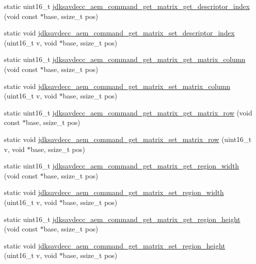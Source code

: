 \begin{DoxyCompactItemize}
static uint16\+\_\+t \hyperlink{group__command__get__matrix_gae06827e874371135ab799f617f6723b3}{jdksavdecc\+\_\+aem\+\_\+command\+\_\+get\+\_\+matrix\+\_\+get\+\_\+descriptor\+\_\+index} (void const $\ast$base, ssize\+\_\+t pos)
\item 
static void \hyperlink{group__command__get__matrix_gaca9cc2cd99f2fc9d00772c2b67e7a411}{jdksavdecc\+\_\+aem\+\_\+command\+\_\+get\+\_\+matrix\+\_\+set\+\_\+descriptor\+\_\+index} (uint16\+\_\+t v, void $\ast$base, ssize\+\_\+t pos)
\item 
static uint16\+\_\+t \hyperlink{group__command__get__matrix_ga8b6906bbd62ce8d5f486ed135860399f}{jdksavdecc\+\_\+aem\+\_\+command\+\_\+get\+\_\+matrix\+\_\+get\+\_\+matrix\+\_\+column} (void const $\ast$base, ssize\+\_\+t pos)
\item 
static void \hyperlink{group__command__get__matrix_gabc0e941d90e8369d8e174cbca31bb1d1}{jdksavdecc\+\_\+aem\+\_\+command\+\_\+get\+\_\+matrix\+\_\+set\+\_\+matrix\+\_\+column} (uint16\+\_\+t v, void $\ast$base, ssize\+\_\+t pos)
\item 
static uint16\+\_\+t \hyperlink{group__command__get__matrix_ga98cce114fc9450f88849c55c12d53578}{jdksavdecc\+\_\+aem\+\_\+command\+\_\+get\+\_\+matrix\+\_\+get\+\_\+matrix\+\_\+row} (void const $\ast$base, ssize\+\_\+t pos)
\item 
static void \hyperlink{group__command__get__matrix_ga7e74565bd026e44fefbc295feeb2d336}{jdksavdecc\+\_\+aem\+\_\+command\+\_\+get\+\_\+matrix\+\_\+set\+\_\+matrix\+\_\+row} (uint16\+\_\+t v, void $\ast$base, ssize\+\_\+t pos)
\item 
static uint16\+\_\+t \hyperlink{group__command__get__matrix_ga802736a4c35bb167c36df5d2ae3e8dec}{jdksavdecc\+\_\+aem\+\_\+command\+\_\+get\+\_\+matrix\+\_\+get\+\_\+region\+\_\+width} (void const $\ast$base, ssize\+\_\+t pos)
\item 
static void \hyperlink{group__command__get__matrix_ga5219bd4a4ba04c2c508564787d526b73}{jdksavdecc\+\_\+aem\+\_\+command\+\_\+get\+\_\+matrix\+\_\+set\+\_\+region\+\_\+width} (uint16\+\_\+t v, void $\ast$base, ssize\+\_\+t pos)
\item 
static uint16\+\_\+t \hyperlink{group__command__get__matrix_ga8ac7ccafd277b7fc4bc0166b0aa787b6}{jdksavdecc\+\_\+aem\+\_\+command\+\_\+get\+\_\+matrix\+\_\+get\+\_\+region\+\_\+height} (void const $\ast$base, ssize\+\_\+t pos)
\item 
static void \hyperlink{group__command__get__matrix_gaacf5a7512aee836dbc33769d97466ca2}{jdksavdecc\+\_\+aem\+\_\+command\+\_\+get\+\_\+matrix\+\_\+set\+\_\+region\+\_\+height} (uint16\+\_\+t v, void $\ast$base, ssize\+\_\+t pos)

\end{DoxyCompactItemize}
